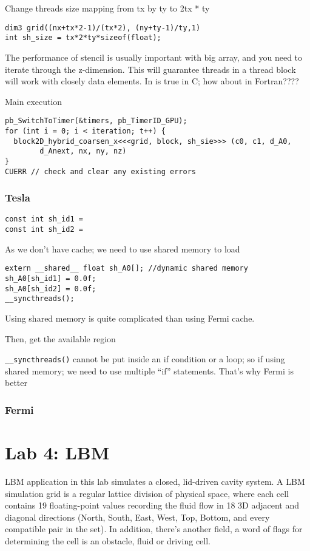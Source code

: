 Change threads size mapping from tx by ty to 2tx * ty
\begin{lstlisting}
dim3 grid((nx+tx*2-1)/(tx*2), (ny+ty-1)/ty,1)
int sh_size = tx*2*ty*sizeof(float);
\end{lstlisting}


The performance of stencil is usually important with big array, and
you need to iterate through the z-dimension. This will guarantee
threads in a thread block will work with closely data elements. In is
true in C; how about in Fortran????

Main execution
\begin{lstlisting}
pb_SwitchToTimer(&timers, pb_TimerID_GPU);
for (int i = 0; i < iteration; t++) {
  block2D_hybrid_coarsen_x<<<grid, block, sh_sie>>> (c0, c1, d_A0,
        d_Anext, nx, ny, nz)
}
CUERR // check and clear any existing errors
\end{lstlisting}

\subsubsection{Tesla}
\label{sec:tesla}
\begin{verbatim}
const int sh_id1 = 
const int sh_id2 = 
\end{verbatim}
As we don't have cache; we need to use shared memory to load 
\begin{verbatim}
extern __shared__ float sh_A0[]; //dynamic shared memory
sh_A0[sh_id1] = 0.0f;
sh_A0[sh_id2] = 0.0f;
__syncthreads();
\end{verbatim}
Using shared memory is quite complicated than using Fermi cache. 

Then, get the available region 


\verb!__syncthreads()! cannot be put inside an if condition or a loop;
so if using shared memory; we need to use multiple ``if''
statements. That's why Fermi is better

\subsubsection{Fermi}
\label{sec:fermi-1}

\section{Lab 4: LBM}
\label{sec:lab-4:-lbm}

LBM application in this lab simulates a closed, lid-driven cavity
system. A LBM simulation grid is a regular lattice division of
physical space, where each cell contains 19 floating-point values
recording the fluid flow in 18 3D adjacent and diagonal directions
(North, South, East, West, Top, Bottom, and every compatible pair in
the set). In addition, there's another field, a word of flags for
determining the cell is an obstacle, fluid or driving cell.

